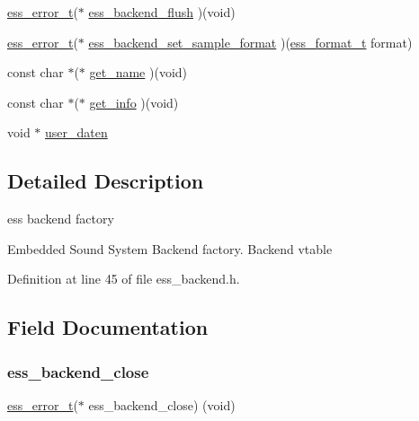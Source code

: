\begin{DoxyCompactItemize}
\item 
\hyperlink{ess__error_8h_a08ab97fcf6745dee67de912e41bd3236}{ess\+\_\+error\+\_\+t}($\ast$ \hyperlink{structess__backend_a9c44052ce6dbe82ca0e25b45b78f0849}{ess\+\_\+backend\+\_\+flush} )(void)
\item 
\hyperlink{ess__error_8h_a08ab97fcf6745dee67de912e41bd3236}{ess\+\_\+error\+\_\+t}($\ast$ \hyperlink{structess__backend_ab081e20cac5828678d80e03f5182a155}{ess\+\_\+backend\+\_\+set\+\_\+sample\+\_\+format} )(\hyperlink{ess__format_8h_a9aa23f58a25b9e8360c1400e0cadfd80}{ess\+\_\+format\+\_\+t} format)
\item 
const char $\ast$($\ast$ \hyperlink{structess__backend_a1e8975441f4fbb374da179cc7e8bcbae}{get\+\_\+name} )(void)
\item 
const char $\ast$($\ast$ \hyperlink{structess__backend_a9f29adb0a4cfb608557d26692fa78254}{get\+\_\+info} )(void)
\item 
void $\ast$ \hyperlink{structess__backend_a5ad8569143b4728c7b7f91c53661d8b5}{user\+\_\+daten}
\end{DoxyCompactItemize}


\subsection{Detailed Description}
ess backend factory 

Embedded Sound System Backend factory. Backend vtable 

Definition at line 45 of file ess\+\_\+backend.\+h.



\subsection{Field Documentation}
\mbox{\label{structess__backend_a5a1aab40f4f3d907977dd2ebd35b1316}} 
\subsubsection{\texorpdfstring{ess\+\_\+backend\+\_\+close}{ess\_backend\_close}}
{\footnotesize\ttfamily \hyperlink{ess__error_8h_a08ab97fcf6745dee67de912e41bd3236}{ess\+\_\+error\+\_\+t}($\ast$  ess\+\_\+backend\+\_\+close) (void)}

